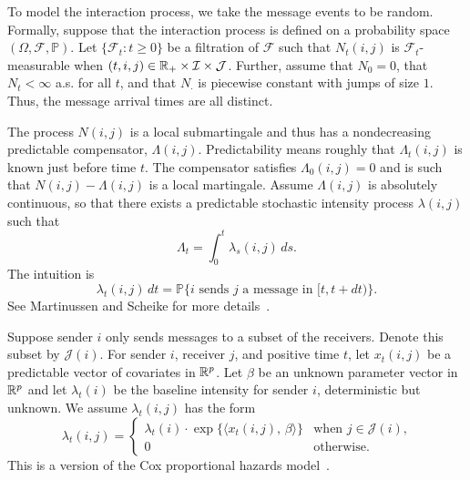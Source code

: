 \documentclass[aoas,preprint]{imsart}
\begin{document}

To model the interaction process, we take the message events to be random.
Formally, suppose that the interaction process is defined on a
probability space $(\Omega, \mathcal{F}, \mathbb{P})$.  Let
$\big\{ \mathcal{F}_t : t \geq 0 \big\}$ be a filtration of $\mathcal{F}$
such that $N_t(i,j)$ is $\mathcal{F}_t$-measurable when
$(t,i,j) \in \mathbb{R}_+ \times \mathcal{I} \times \mathcal{J}$.  Further,
assume that $N_0 = 0$, that $N_t < \infty$ a.s. for all $t$, and that 
$N_\cdot$ is piecewise constant with jumps of size $1$.  Thus, the message
arrival times are all distinct.

The process $N(i,j)$ is a local submartingale and thus has a 
nondecreasing predictable compensator, $\Lambda(i,j)$.  Predictability
means roughly that $\Lambda_t(i,j)$ is known just before time $t$.  The
compensator satisfies $\Lambda_0(i,j) = 0$ and is such that
\(
    N(i,j) - \Lambda(i,j)
\)
is a local martingale.  Assume $\Lambda(i,j)$ is absolutely continuous,
so that there exists a predictable stochastic intensity process $\lambda(i,j)$
such that
\[
    \Lambda_t = \int_0^t \lambda_s(i,j) \, ds.
\]
The intuition is
\[
    \lambda_t(i,j) \, dt
        =
        \mathbb{P}\{
            \text{$i$ sends $j$ a message in $[t,t+dt)$}
        \}.
\]
See Martinussen and Scheike for more details~\cite{martinussen2006dynamic}.

Suppose sender $i$ only sends messages to a subset of the receivers.  Denote
this subset by $\mathcal{J}(i)$.  For sender $i$, receiver $j$, and positive
time $t$, let $x_t(i,j)$ be a predictable vector of covariates in $\mathbb{R}^p$.
Let $\beta$ be an unknown parameter vector in $\mathbb{R}^p$ and let
$\lambda_t(i)$ be the baseline intensity for sender $i$, deterministic but
unknown.  We assume $\lambda_t(i,j)$ has the form
\begin{equation}
    \lambda_t(i,j)
        = 
        \begin{cases}
            \lambda_t(i)
            \cdot
            \exp\{ \langle x_t(i,j), \, \beta \rangle \}
                &\text{when $j \in \mathcal{J}(i)$,} \\
            0
                &\text{otherwise.}
        \end{cases}
\end{equation}
This is a version of the Cox proportional hazards
model~\cite{cox1972regression}.
\end{document}
